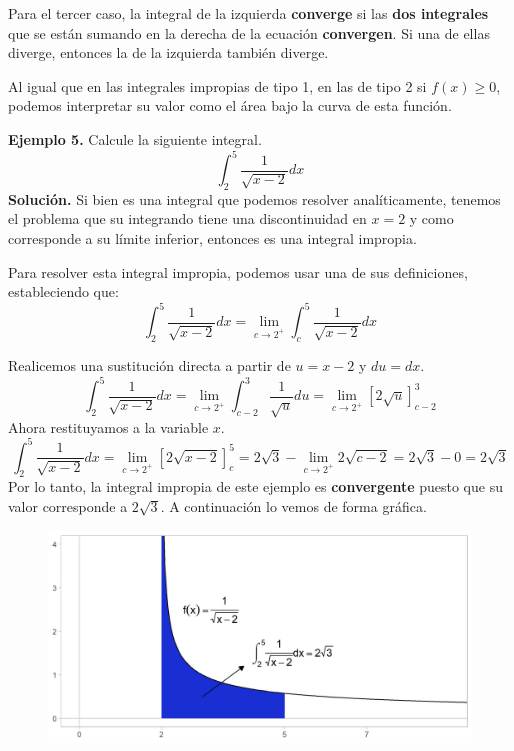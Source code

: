 \documentclass[12pt]{article}
\begin{document}
Para el tercer caso, la integral de la izquierda \textbf{converge} si las \textbf{dos integrales} que se están sumando en la derecha de la ecuación \textbf{convergen}. Si una de ellas diverge, entonces la de la izquierda también diverge.

Al igual que en las integrales impropias de tipo 1, en las de tipo 2 si $f(x) \geq 0$, podemos interpretar su valor como el área bajo la curva de esta función.

\textbf{Ejemplo 5.} Calcule la siguiente integral.
\[
  \int_{2}^{5} \frac{1}{\sqrt{x - 2}} dx
\]
\textbf{Solución.} Si bien es una integral que podemos resolver analíticamente, tenemos el problema que su integrando tiene una discontinuidad en $x = 2$ y como corresponde a su límite inferior, entonces es una integral impropia.

Para resolver esta integral impropia, podemos usar una de sus definiciones, estableciendo que:
\[
  \int_{2}^{5} \frac{1}{\sqrt{x - 2}} dx = \lim_{c \to 2^{+}} \int_{c}^{5} \frac{1}{\sqrt{x - 2}} dx
\]

Realicemos una sustitución directa a partir de $u = x - 2$ y $du = dx$.
\[
  \int_{2}^{5} \frac{1}{\sqrt{x - 2}} dx = \lim_{c \to 2^{+}} \int_{c - 2}^{3} \frac{1}{\sqrt{u}} du
                                         = \lim_{c \to 2^{+}} [2 \sqrt{u}]_{c - 2}^{3}
\]
Ahora restituyamos a la variable $x$.
\[
  \int_{2}^{5} \frac{1}{\sqrt{x - 2}} dx = \lim_{c \to 2^{+}} [2 \sqrt{x - 2}]_{c}^{5}
                                         = 2 \sqrt{3} - \lim_{c \to 2^{+}} 2 \sqrt{c - 2}
                                         = 2 \sqrt{3} - 0
                                         = 2 \sqrt{3}
\]
Por lo tanto, la integral impropia de este ejemplo es \textbf{convergente} puesto que su valor corresponde a $2 \sqrt{3}$. A continuación lo vemos de forma gráfica.

\begin{figure}[hbt!]
\centering
\includegraphics[scale = 0.7]{example-05.jpg}
\end{figure}
\end{document}
